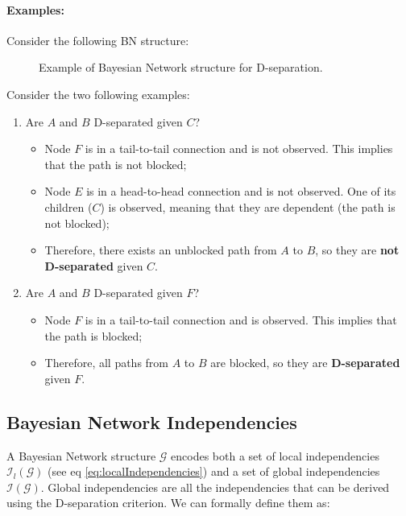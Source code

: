 \paragraph{Examples:}
Consider the following BN structure:
\begin{figure}[H]
\centering
    \caption{Example of Bayesian Network structure for D-separation.}
\end{figure}
Consider the two following examples:
\begin{enumerate}
    \item Are $A$ and $B$ D-separated given $C$?
    \begin{itemize}
        \item Node $F$ is in a tail-to-tail connection and is not observed. This implies that the path is not blocked;
        \item Node $E$ is in a head-to-head connection and is not observed. One of its children ($C$) is observed, meaning
        that they are dependent (the path is not blocked);
        \item Therefore, there exists an unblocked path from $A$ to $B$, so they are \textbf{not D-separated} given $C$.
    \end{itemize}
    \item Are $A$ and $B$ D-separated given $F$?
    \begin{itemize}
        \item Node $F$ is in a tail-to-tail connection and is observed. This implies that the path is blocked;
        \item Therefore, all paths from $A$ to $B$ are blocked, so they are \textbf{D-separated} given $F$.
    \end{itemize}
\end{enumerate}

\subsection{Bayesian Network Independencies}
A Bayesian Network structure $\mathcal{G}$ encodes both a set of local independencies $\mathcal{I}_l(\mathcal{G})$ (see eq \ref{eq:localIndependencies})
and a set of global independencies $\mathcal{I}(\mathcal{G})$.
Global independencies are all the independencies that can be derived using the D-separation criterion.
We can formally define them as:
\begin{figure}[H]
\end{figure}


